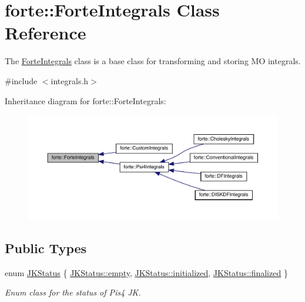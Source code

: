\hypertarget{classforte_1_1_forte_integrals}{}\section{forte\+:\+:Forte\+Integrals Class Reference}
\label{classforte_1_1_forte_integrals}


The \mbox{\hyperlink{classforte_1_1_forte_integrals}{Forte\+Integrals}} class is a base class for transforming and storing MO integrals.  




{\ttfamily \#include $<$integrals.\+h$>$}



Inheritance diagram for forte\+:\+:Forte\+Integrals\+:
\nopagebreak
\begin{figure}[H]
\begin{center}
\leavevmode
\includegraphics[width=350pt]{classforte_1_1_forte_integrals__inherit__graph}
\end{center}
\end{figure}
\subsection*{Public Types}
\begin{DoxyCompactItemize}
\item 
enum \mbox{\hyperlink{classforte_1_1_forte_integrals_a5ef066e57ff1494e90669779b1d0ecc2}{J\+K\+Status}} \{ \mbox{\hyperlink{classforte_1_1_forte_integrals_a5ef066e57ff1494e90669779b1d0ecc2aa2e4822a98337283e39f7b60acf85ec9}{J\+K\+Status\+::empty}}, 
\mbox{\hyperlink{classforte_1_1_forte_integrals_a5ef066e57ff1494e90669779b1d0ecc2a84d10a1ed612e61dbf6880f6e3ee533a}{J\+K\+Status\+::initialized}}, 
\mbox{\hyperlink{classforte_1_1_forte_integrals_a5ef066e57ff1494e90669779b1d0ecc2a73d0ccbca69b94ee4cd7fc367a8ac9fc}{J\+K\+Status\+::finalized}}
 \}
\begin{DoxyCompactList}\small\item\em Enum class for the status of Pis4 JK. \end{DoxyCompactList}\end{DoxyCompactItemize}
